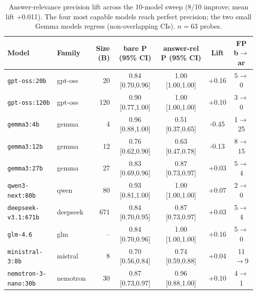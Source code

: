 \begin{table}[t]
\centering
\small
\begin{tabular}{llrcccc}
\toprule
Model & Family & Size (B) & bare P (95\% CI) & answer-rel P (95\% CI) & Lift & FP b$\rightarrow$ar \\
\midrule
\texttt{gpt-oss:20b} & gpt-oss & 20 & 0.84 [0.70,0.96] & 1.00 [1.00,1.00] & +0.16 & 5$\rightarrow$0 \\
\texttt{gpt-oss:120b} & gpt-oss & 120 & 0.90 [0.77,1.00] & 1.00 [1.00,1.00] & +0.10 & 3$\rightarrow$0 \\
\texttt{gemma3:4b} & gemma & 4 & 0.96 [0.88,1.00] & 0.51 [0.37,0.65] & -0.45 & 1$\rightarrow$25 \\
\texttt{gemma3:12b} & gemma & 12 & 0.76 [0.62,0.90] & 0.63 [0.47,0.78] & -0.13 & 8$\rightarrow$15 \\
\texttt{gemma3:27b} & gemma & 27 & 0.83 [0.69,0.96] & 0.87 [0.73,0.97] & +0.03 & 5$\rightarrow$4 \\
\texttt{qwen3-next:80b} & qwen & 80 & 0.93 [0.81,1.00] & 1.00 [1.00,1.00] & +0.07 & 2$\rightarrow$0 \\
\texttt{deepseek-v3.1:671b} & deepseek & 671 & 0.84 [0.70,0.95] & 0.87 [0.73,0.97] & +0.03 & 5$\rightarrow$4 \\
\texttt{glm-4.6} & glm & -- & 0.84 [0.70,0.96] & 1.00 [1.00,1.00] & +0.16 & 5$\rightarrow$0 \\
\texttt{ministral-3:8b} & mistral & 8 & 0.70 [0.56,0.84] & 0.74 [0.59,0.88] & +0.04 & 11$\rightarrow$9 \\
\texttt{nemotron-3-nano:30b} & nemotron & 30 & 0.87 [0.73,0.97] & 0.96 [0.88,1.00] & +0.10 & 4$\rightarrow$1 \\
\bottomrule
\end{tabular}
\caption{Answer-relevance precision lift across the 10-model sweep
(8/10 improve; mean lift +0.011).
The four most capable models reach perfect precision; the two small Gemma models regress
(non-overlapping CIs). $n=63$ probes.}
\label{tab:sweep}
\end{table}
